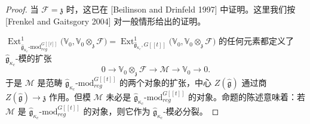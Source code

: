 \begin{proof}
    当 $\mathcal{F}=\mathfrak{z}$ 时，这已在 [Beilinson and Drinfeld 1997] 中证明。这里我们按 [Frenkel and Gaitsgory 2004] 对一般情形给出的证明。

    $\operatorname{Ext}^1_{\hat{\mathfrak{g}}_{\kappa_c}\text{-mod}^{G[[t]]}_{reg}}\bigl(\mathbb{V}_0,\mathbb{V}_0\otimes_{\mathfrak{z}}\mathcal{F}\bigr)=\operatorname{Ext}^1_{\hat{\mathfrak{g}}_{\kappa_c},G[[t]]}\bigl(\mathbb{V}_0,\mathbb{V}_0\otimes_{\mathfrak{z}}\mathcal{F}\bigr)$ 的任何元素都定义了 $\hat{\mathfrak{g}}_{\kappa_c}$-模的扩张
    \begin{equation}
        0\to\mathbb{V}_0\otimes_{\mathfrak{z}}\mathcal{F}\to\mathcal{M}\to\mathbb{V}_0\to0.
        \tag{10.3-16}
    \end{equation}
    于是 $\mathcal{M}$ 是范畴 $\hat{\mathfrak{g}}_{\kappa_c}\text{-mod}^{G[[t]]}_{reg}$ 的两个对象的扩张，中心 $Z(\hat{\mathfrak{g}})$ 通过商 $Z(\hat{\mathfrak{g}})\to\mathfrak{z}$ 作用。但模 $\mathcal{M}$ 未必是 $\hat{\mathfrak{g}}_{\kappa_c}\text{-mod}^{G[[t]]}_{reg}$ 的对象。命题的陈述意味着：若 $\mathcal{M}$ 是 $\hat{\mathfrak{g}}_{\kappa_c}\text{-mod}^{G[[t]]}_{reg}$ 的对象，则它作为 $\hat{\mathfrak{g}}_{\kappa_c}$-模必分裂。


\end{proof}
